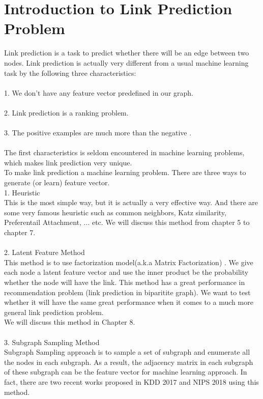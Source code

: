 \documentclass[12pt]{article}
\begin{document}
\section{Introduction to Link Prediction Problem}
Link prediction is a task to predict whether there will be an edge between two nodes. Link prediction is actually very different from a usual machine learning task by the following three characteristics:
\\ \\
1. We don't have any feature vector predefined in our graph. 
\\ \\
2. Link prediction is a ranking problem.
\\ \\
3. The positive examples are much more than the negative . 
\\  \\
The first characteristics is seldom encountered in machine learning problems, which makes link prediction very unique.  \\
To make link prediction a machine learning problem. There are three ways to generate (or learn) feature vector. \\
1. Heuristic \\ 
This is the most simple way, but it is actually a very effective way. And there are some very famous heuristic such as common neighbors, Katz similarity, Preferentail Attachment, ... etc.  We will discuss this method from chapter 5 to chapter 7. \\ \\
2. Latent Feature Method \\
This method is to use factorization model(a.k.a Matrix Factorization) \cite{mf}. We give each node a latent feature vector and use the inner product be the probability whether the node will have the link. This method has a great performance in recommendation problem (link prediction in biparitite graph). We want to test whether it will have the same great performance when it comes to a much more general link prediction problem. 
\\
We will discuss this method in Chapter 8.
\\ \\
3. Subgraph Sampling Method \\ 
Subgraph Sampling approach is to sample a set of subgraph and enumerate all the nodes in each subgraph. As a result, the adjacency matrix in each subgraph of these subgraph can be the feature vector for machine learning approach. In fact, there are two recent works proposed in KDD 2017 \cite{lp2017} and NIPS 2018 \cite{lp2018} using this method. 
\end{document}
